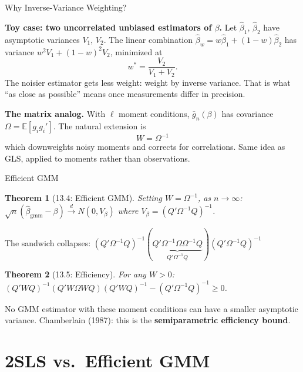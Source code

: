 \documentclass[aspectratio=169, handout, t]{beamer}
\newtheorem{thm}{Theorem}
\numberwithin{equation}{section}
\begin{document}
\begin{frame}{Why Inverse-Variance Weighting?}

\textbf{Toy case: two uncorrelated unbiased estimators of $\beta$.}  Let $\hat\beta_1$, $\hat\beta_2$ have asymptotic variances $V_1$, $V_2$.  The linear combination $\hat\beta_w = w\hat\beta_1 + (1-w)\hat\beta_2$ has variance $w^2 V_1 + (1-w)^2 V_2$, minimized at
$$w^* = \frac{V_2}{V_1+V_2}.$$
The noisier estimator gets less weight: weight by inverse variance.  That is what ``as close as possible'' means once measurements differ in precision.

\medskip
\textbf{The matrix analog.}  With $\ell$ moment conditions, $\bar g_n(\beta)$ has covariance $\Omega = \mathbb{E}[g_i g_i']$.  The natural extension is
$$\boxed{W = \Omega^{-1}}$$
which downweights noisy moments and corrects for correlations.  Same idea as GLS, applied to moments rather than observations.

\end{frame}

\begin{frame}{Efficient GMM}

\begin{thm}[13.4: Efficient GMM]
Setting $W = \Omega^{-1}$, as $n\to\infty$:
$\sqrt{n}(\hat\beta_{\text{gmm}} - \beta) \xrightarrow{d} N(0, V_\beta)$ where $V_\beta = (Q'\Omega^{-1}Q)^{-1}$.
\end{thm}

The sandwich \alert{collapses}: $(Q'\Omega^{-1}Q)^{-1}(\underbrace{Q'\Omega^{-1}\Omega \Omega^{-1}Q}_{Q'\Omega^{-1}Q})(Q'\Omega^{-1}Q)^{-1}$

\begin{thm}[13.5: Efficiency]
For any $W > 0$:
$(Q'WQ)^{-1}(Q'W\Omega WQ)(Q'WQ)^{-1} - (Q'\Omega^{-1}Q)^{-1} \geq 0$.
\end{thm}

No GMM estimator with these moment conditions can have a smaller asymptotic variance.  Chamberlain (1987): this is the \textbf{semiparametric efficiency bound}.

\end{frame}

\section{2SLS vs.\ Efficient GMM}
\end{document}
